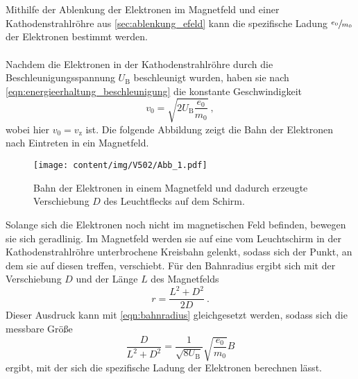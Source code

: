     \\
    \\
    Mithilfe der Ablenkung der Elektronen im Magnetfeld und einer Kathodenstrahlröhre aus \autoref{sec:ablenkung_efeld} kann die spezifische Ladung $\sfrac{e_0}{m_0}$ der Elektronen bestimmt werden.\\
    \\
    Nachdem die Elektronen in der Kathodenstrahlröhre durch die Beschleunigungsspannung $U_\text{B}$ beschleunigt wurden,
    haben sie nach \autoref{eqn:energieerhaltung_beschleunigung} die konstante Geschwindigkeit
    \begin{equation}
        v_0 = \sqrt{2 U_\text{B} \frac{e_0}{m_0}} \ ,
    \end{equation}
    wobei hier $v_0 = v_\text{z}$ ist.
    Die folgende Abbildung zeigt die Bahn der Elektronen nach Eintreten in ein Magnetfeld.
    \begin{figure}[H]
       \centering
        \texttt{[image: content/img/V502/Abb\_1.pdf]}
        \caption{Bahn der Elektronen in einem Magnetfeld und dadurch erzeugte Verschiebung $D$ des Leuchtflecks auf dem Schirm. \cite{versuchsanleitung502}}
        \label{fig:elektronenbahn_magnetfeld}
    \end{figure}
    Solange sich die Elektronen noch nicht im magnetischen Feld befinden,
    bewegen sie sich geradlinig.
    Im Magnetfeld werden sie auf eine vom Leuchtschirm in der Kathodenstrahlröhre unterbrochene Kreisbahn gelenkt,
    sodass sich der Punkt,
    an dem sie auf diesen treffen,
    verschiebt.
    Für den Bahnradius ergibt sich mit der Verschiebung $D$ und der Länge $L$ des Magnetfelds
    \begin{equation}
        r = \frac{L^2 + D^2}{2D} \ .
    \end{equation}
    Dieser Ausdruck kann mit \autoref{eqn:bahnradius} gleichgesetzt werden,
    sodass sich die messbare Größe
    \begin{equation}
        \frac{D}{L^2 + D^2} = \frac{1}{\sqrt{8 U_\text{B}}} \sqrt{\frac{e_0}{m_0}} B
        \label{eqn:formel_verschiebung}
    \end{equation}
    ergibt,
    mit der sich die spezifische Ladung der Elektronen berechnen lässt.
